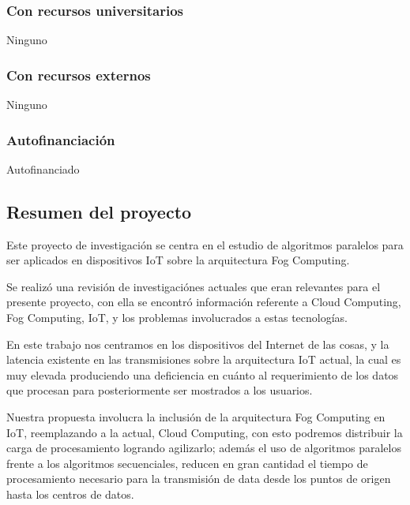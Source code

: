     \subsubsection{Con recursos universitarios}
        Ninguno
    \subsubsection{Con recursos externos}
        Ninguno
    \subsubsection{Autofinanciación}
        Autofinanciado

\subsection{Resumen del proyecto}
    Este proyecto de investigación se centra en el estudio de algoritmos paralelos para ser aplicados en dispositivos IoT sobre la arquitectura Fog Computing.\par
    Se realizó una revisión de investigaciónes actuales que eran relevantes para el presente proyecto, con ella se encontró información referente a Cloud Computing, Fog Computing, IoT, y los problemas involucrados a estas tecnologías.\par
    En este trabajo nos centramos en los dispositivos del Internet de las cosas, y la latencia existente en las transmisiones sobre la arquitectura IoT actual, la cual es muy elevada produciendo una deficiencia en cuánto al requerimiento de los datos que procesan para posteriormente ser mostrados a los usuarios.\par
    Nuestra propuesta involucra la inclusión de la arquitectura Fog Computing en IoT, reemplazando a la actual, Cloud Computing, con esto podremos distribuir la carga de procesamiento logrando agilizarlo; además el uso de algoritmos paralelos frente a los algoritmos secuenciales, reducen en gran cantidad el tiempo de procesamiento necesario para la transmisión de data desde los puntos de origen hasta los centros de datos.\par
